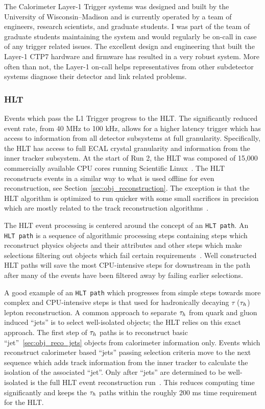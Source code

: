 The Calorimeter Layer-1 Trigger systems was designed and built by the University of
Wisconsin--Madison and is currently operated by a team of engineers, research
scientists, and graduate students. I was part of the team of graduate students maintaining
the system and would regularly be on-call in case of any trigger related issues. The
excellent design and engineering that built the Layer-1 CTP7 hardware and firmware
has resulted in a very robust system. More often than not, the Layer-1 on-call
helps representatives from other subdetector systems diagnose their detector and link related problems.



\subsubsection{HLT}
Events which pass the L1 Trigger progress to the HLT. The significantly reduced
event rate, from 40 MHz to 100 kHz, allows for a higher latency trigger which
has access to information from all detector subsystems at full granularity.
Specifically, the HLT has access to full ECAL crystal granularity and
information from the inner tracker subsystem. At the start of Run 2, the HLT
was composed of 15,000 commercially available CPU cores running Scientific
Linux~\cite{cms_daq_7097437}. The HLT reconstructs events in a similar way
to what is used offline for even reconstruction, see Section~\ref{sec:obj_reconstruction}. 
The exception is that the HLT algorithm is optimized to run quicker with some small sacrifices 
in precision which are mostly related to the track reconstruction 
algorithms~\cite{Khachatryan:2016bia}.

The HLT event processing is centered around the concept of an \texttt{HLT path}.
An \texttt{HLT path} is a sequence of algorithmic processing steps containing
steps which reconstruct physics objects and their attributes and other steps
which make selections filtering out objects which fail certain 
requirements~\cite{Khachatryan:2016bia}. Well constructed HLT paths will
save the most CPU-intensive steps for downstream in the path after many of the
events have been filtered away by failing earlier selections. 

A good example
of an \texttt{HLT path} which progresses from simple steps towards more complex and 
CPU-intensive steps is that used for hadronically decaying $\tau$ ($\tau_{h}$) lepton reconstruction.
A common approach to separate $\tau_{h}$ from quark and gluon induced ``jets'' is
to select well-isolated objects; the HLT relies on this exact approach.
The first step of $\tau_{h}$ paths is to reconstruct basic ``jet''~\ref{sec:obj_reco_jets} objects from
calorimeter information only. Events which reconstruct calorimeter based ``jets''
passing selection criteria move to the next sequence which adds track information 
from the inner tracker to calculate the isolation of the associated ``jet''.
Only after ``jets'' are determined to be well-isolated is the full HLT event 
reconstruction run~\cite{Khachatryan:2016bia}. This reduces computing time significantly
and keeps the $\tau_{h}$ paths within the roughly 200 ms time requirement for
the HLT.

